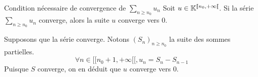 \documentclass{article}
\date{30 juin 2024}
\begin{document}
\maketitle

\begin{question_kholle}{Condition nécessaire de convergence de $\sum_{n \geqslant n_0} u_n$}
    Soit $u \in \mathbb K^{[ \! [ n_{0}, + \infty [ \![}$.
    Si la série $\sum_{n\geqslant n_{0}}u_{n}$ converge, alors la suite $u$ converge vers $0$.
    
    Supposons que la série converge. Notons $(S_{n})_{n\geqslant n_{0}}$ la suite des sommes partielles.
$$\forall n \in [ \! [ n_{0}+1, +\infty [ \![, u_{n} = S_{n} - S_{n-1}$$
    Puisque $S$ converge, on en déduit que $u$ converge vers $0$.
\end{question_kholle}
\end{document}

